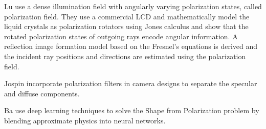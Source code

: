 \dagg Lu \etal \cite{lu2019mirror} use a dense illumination field with angularly varying polarization states, called polarization field. They use a commercial LCD and
mathematically model the liquid crystals as polarization rotators using Jones calculus and show that the rotated polarization states of outgoing rays encode angular information. A reflection image formation model based on the Fresnel's equations is derived and the incident ray positions and directions are estimated using the polarization field. 

Jospin \etal \cite{jospin2018embedded} incorporate polarization filters in camera designs to separate the specular and diffuse components.

\dagg Ba \etal \cite{ba2019physics} use deep learning techniques to solve the Shape from Polarization problem by blending approximate physics into neural networks. 
